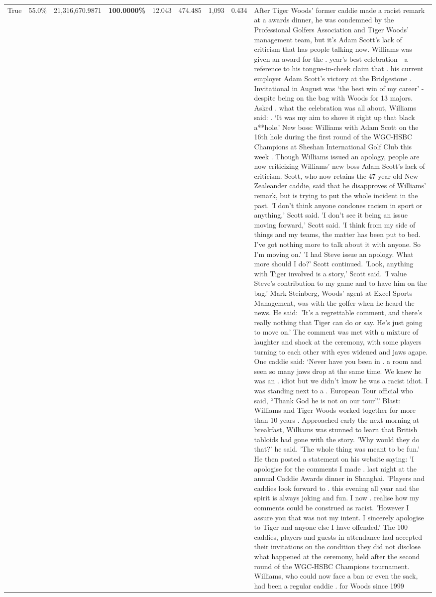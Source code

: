 \begin{table}[H]
\begin{tabular}{lllrlllll}
True & 55.0\% & 21,316,670.9871 & \bfseries \color{red} 100.0000\% & 12.043 & 474.485 & 1,093 & 0.434 & After Tiger Woods' former caddie made a racist remark at a awards dinner, he was condemned by the Professional Golfers Association and Tiger Woods' management team, but it's Adam Scott's lack of criticism that has people talking now. Williams was given an award for the . year’s best celebration - a reference to his tongue-in-cheek claim that . his current employer Adam Scott’s victory at the Bridgestone . Invitational in August was ‘the best win of my career’ - despite being on the bag with Woods for 13 majors. Asked . what the celebration was all about, Williams said: . ‘It was my aim to shove it right up that black a**hole.’ New boss: Williams with Adam Scott  on the 16th hole during the first round of the WGC-HSBC Champions at Sheshan International Golf Club this week . Though Williams issued an apology, people are now criticizing Williams' new boss Adam Scott's lack of criticism. Scott, who now retains the 47-year-old New Zealeander caddie, said that he disapproves of Williams' remark, but is trying to put the whole incident in the past. 'I don't think anyone condones racism in sport or anything,' Scott said. 'I don't see it being an issue moving forward,' Scott said. 'I think from my side of things and my teams, the matter has been put to bed. I've got nothing more to talk about it with anyone. So I'm moving on.' 'I had Steve issue an apology. What more should I do?' Scott continued. 'Look, anything with Tiger involved is a story,' Scott said. 'I value Steve's contribution to my game and to have him on the bag.' Mark Steinberg, Woods' agent at Excel Sports Management, was with the golfer when he heard the news. He said: 'It's a regrettable comment, and there's really nothing that Tiger can do or say. He's just going to move on.' The comment was met with a mixture of laughter and shock at the ceremony, with some players turning to each other with eyes widened and jaws agape. One caddie said: ‘Never have you been in . a room and seen so many jaws drop at the same time. We knew he was an . idiot but we didn’t know he was a racist idiot. I was standing next to a . European Tour official who said, “Thank God he is not on our tour”.’ Blast: Williams and Tiger Woods worked together for more than 10 years . Approached early the next morning at breakfast, Williams was stunned to learn that British tabloids had gone with the story. 'Why would they do that?' he said. 'The whole thing was meant to be fun.' He then posted a statement on his website saying: 'I apologise for the comments I made . last night at the annual Caddie Awards dinner in Shanghai. 'Players and caddies look forward to . this evening all year and the spirit is always joking and fun. I now . realise how my comments could be construed as racist. 'However I assure you that was not my intent. I sincerely apologise to Tiger and anyone else I have offended.' The 100 caddies, players and guests in attendance had accepted their invitations on the condition they did not disclose what happened at the ceremony, held after the second round of the WGC-HSBC Champions tournament. Williams, who could now face a ban or even the sack, had been a regular caddie . for Woods since 1999 
\end{tabular}
\end{table}
